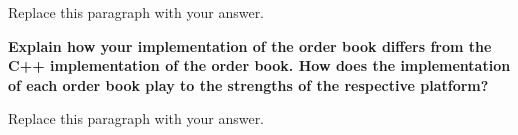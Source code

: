 \documentclass[11pt]{article}
\newcommand{\prompt}[1]{\par\medskip\noindent\textbf{#1}\par\smallskip\noindent\ignorespaces}
\begin{document}
%
%
Replace this paragraph with your answer.

\prompt{Explain how your implementation of the order book differs from the C++ implementation of the order book. How does the implementation of each order book play to the strengths of the respective platform?}
%
%
%
Replace this paragraph with your answer.
\end{document}
